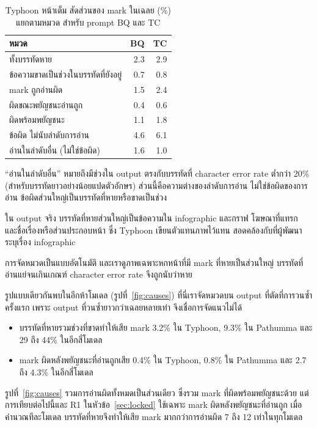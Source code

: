 \begin{table}[t]
\caption{Typhoon หน้าเต็ม สัดส่วนของ mark ในเฉลย (\%) แยกตามหมวด สำหรับ prompt BQ และ TC}\label{tab:causes}
\centering\footnotesize
\begin{tabular}{@{}l rr@{}}
\toprule
หมวด & BQ & TC\\
\midrule
ทั้งบรรทัดหาย & 2.3 & 2.9\\
ข้อความขาดเป็นช่วงในบรรทัดที่ยังอยู่ & 0.7 & 0.8\\
mark ถูกอ่านผิด & 1.5 & 2.4\\
\quad ผิดขณะพยัญชนะอ่านถูก & 0.4 & 0.6\\
\quad ผิดพร้อมพยัญชนะ & 1.1 & 1.8\\
\midrule
ข้อผิด ไม่นับลำดับการอ่าน & 4.6 & 6.1\\
อ่านในลำดับอื่น (ไม่ใช่ข้อผิด) & 1.6 & 1.0\\
\bottomrule
\end{tabular}
\end{table}

``อ่านในลำดับอื่น'' หมายถึงมีช่วงใน output ตรงกับบรรทัดที่ character error rate ต่ำกว่า 20\% (สำหรับบรรทัดยาวอย่างน้อยแปดตัวอักษร) ส่วนนี้คือความต่างของลำดับการอ่าน ไม่ใช่ข้อผิดของการอ่าน ข้อผิดส่วนใหญ่เป็นบรรทัดที่หายหรือขาดเป็นช่วง

ใน output จริง บรรทัดที่หายส่วนใหญ่เป็นข้อความใน infographic และกราฟ โฆษณาที่แทรก และชื่อเรื่องหรือส่วนประกอบหน้า ซึ่ง Typhoon เขียนตัวแทนภาพไว้แทน สอดคล้องกับที่ผู้พัฒนาระบุเรื่อง infographic \cite{nonesung2026typhoonocr}

การจัดหมวดเป็นแบบอัตโนมัติ และเราดูภาพเฉพาะหกหน้าที่มี mark ที่หายเป็นส่วนใหญ่ บรรทัดที่อ่านแย่จนเกินเกณฑ์ character error rate จึงถูกนับว่าหาย

รูปแบบเดียวกันพบในอีกห้าโมเดล (รูปที่~\ref{fig:causes}) ที่นี่เราจัดหมวดบน output ที่ตัดที่การวนซ้ำครั้งแรก เพราะ output ที่วนซ้ำยาวกว่าเฉลยหลายเท่า จึงเชื่อการจัดแนวไม่ได้
\begin{itemize}
\item บรรทัดที่หายรวมช่วงที่ขาดทำให้เสีย mark 3.2\% ใน Typhoon, 9.3\% ใน Pathumma และ 29 ถึง 44\% ในอีกสี่โมเดล
\item mark ผิดหลังพยัญชนะที่อ่านถูกเสีย 0.4\% ใน Typhoon, 0.8\% ใน Pathumma และ 2.7 ถึง 4.3\% ในอีกสี่โมเดล
\end{itemize}
รูปที่~\ref{fig:causes} รวมการอ่านผิดทั้งหมดเป็นส่วนเดียว ซึ่งรวม mark ที่ผิดพร้อมพยัญชนะด้วย แต่การเทียบต่อไปนี้และ R1 ในหัวข้อ~\ref{sec:locked} ใช้เฉพาะ mark ผิดหลังพยัญชนะที่อ่านถูก เมื่อคำนวณทีละโมเดล บรรทัดที่หายจึงทำให้เสีย mark มากกว่าการอ่านผิด 7 ถึง 12 เท่าในทุกโมเดล

